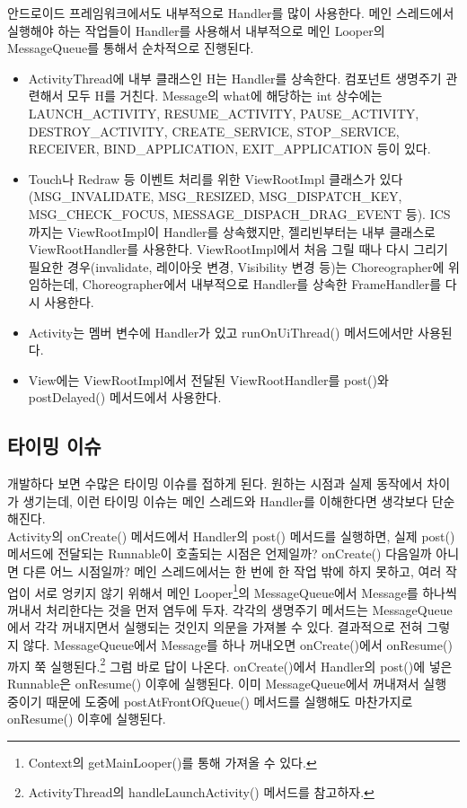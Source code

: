 안드로이드 프레임워크에서도 내부적으로 Handler를 많이 사용한다. 
메인 스레드에서 실행해야 하는 작업들이 Handler를 사용해서 내부적으로 메인 Looper의 MessageQueue를 통해서 순차적으로 진행된다.
\begin{itemize}
\item ActivityThread에 내부 클래스인 H는 Handler를 상속한다. 
컴포넌트 생명주기 관련해서 모두 H를 거친다. Message의 what에 해당하는 int 상수에는 LAUNCH\_ACTIVITY, RESUME\_ACTIVITY, PAUSE\_ACTIVITY, DESTROY\_ACTIVITY, CREATE\_SERVICE, STO\-P\_SERVICE, RECEIVER, BIND\_APPLICATION, EXIT\_APPLICATION 등이 있다.

\item Touch나 Redraw 등 이벤트 처리를 위한 ViewRootImpl 클래스가 있다(MSG\_INVALIDATE, MSG\_R\-E\-SIZED, MSG\_DISPATCH\_KEY, MSG\_CHECK\_FOCUS, MESSAGE\_DISPACH\_DRAG\_EV\-ENT 등).
ICS까지는 ViewRootImpl이 Handler를 상속했지만, 젤리빈부터는 내부 클래스로 ViewRootHandler를 사용한다.
ViewRootImpl에서 처음 그릴 때나 다시 그리기 필요한 경우(invalidate, 레이아웃 변경, Visibility 변경 등)는 Choreographer에 위임하는데, Choreographer에서 내부적으로 Handler를 상속한 FrameHandler를 다시 사용한다.

\item Activity는 멤버 변수에 Handler가 있고 runOnUiThread() 메서드에서만 사용된다. 

\item View에는 ViewRootImpl에서 전달된 ViewRootHandler를 post()와 postDelayed() 메서드에서 사용한다.
\end{itemize}

\subsection{타이밍 이슈}
개발하다 보면 수많은 타이밍 이슈를 접하게 된다. 원하는 시점과 실제 동작에서 차이가 생기는데, 이런 타이밍 이슈는 메인 스레드와 Handler를 이해한다면 생각보다 단순해진다.\\

Activity의 onCreate() 메서드에서 Handler의 post() 메서드를 실행하면, 실제 post() 메서드에 전달되는 Runnable이 호출되는 시점은 언제일까? onCreate() 다음일까 아니면 다른 어느 시점일까?
메인 스레드에서는 한 번에 한 작업 밖에 하지 못하고, 여러 작업이 서로 엉키지 않기 위해서 메인 Looper\footnote{Context의 getMainLooper()를 통해 가져올 수 있다.}의 MessageQueue에서 Message를 하나씩 꺼내서 처리한다는 것을 먼저 염두에 두자.
각각의 생명주기 메서드는 MessageQueue에서 각각 꺼내지면서 실행되는 것인지 의문을 가져볼 수 있다. 결과적으로 전혀 그렇지 않다.
MessageQueue에서 Message를 하나 꺼내오면 onCreate()에서 onResume()까지 쭉 실행된다.\footnote{ActivityThread의 handleLaunchActivity() 메서드를 참고하자.} 그럼 바로 답이 나온다. 
onCreate()에서 Handler의 post()에 넣은 Runnable은 onResume() 이후에 실행된다.
이미 MessageQueue에서 꺼내져서 실행 중이기 때문에 도중에 postAtFrontOfQueue() 메서드를 실행해도 마찬가지로 onResume() 이후에 실행된다.\\

